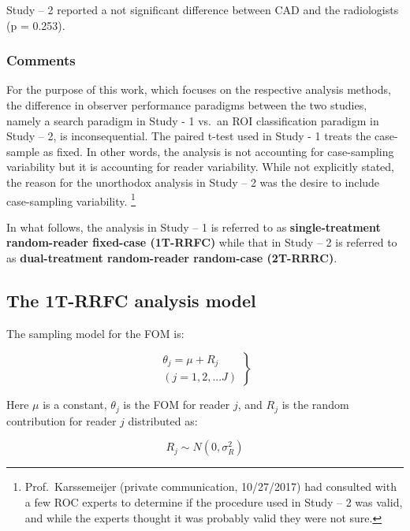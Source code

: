 \documentclass[
]{book}
\begin{document}
Study -- 2 reported a not significant difference between CAD and the radiologists (p = 0.253).

\hypertarget{standalone-cad-radiologists-comments}{%
\subsubsection{Comments}\label{standalone-cad-radiologists-comments}}

For the purpose of this work, which focuses on the respective analysis methods, the difference in observer performance paradigms between the two studies, namely a search paradigm in Study - 1 vs.~an ROI classification paradigm in Study -- 2, is inconsequential. The paired t-test used in Study - 1 treats the case-sample as fixed. In other words, the analysis is not accounting for case-sampling variability but it is accounting for reader variability. While not explicitly stated, the reason for the unorthodox analysis in Study -- 2 was the desire to include case-sampling variability. \footnote{Prof.~Karssemeijer (private communication, 10/27/2017) had consulted with a few ROC experts to determine if the procedure used in Study -- 2 was valid, and while the experts thought it was probably valid they were not sure.}

In what follows, the analysis in Study -- 1 is referred to as \textbf{single-treatment random-reader fixed-case (1T-RRFC)} while that in Study -- 2 is referred to as \textbf{dual-treatment random-reader random-case (2T-RRRC)}.

\hypertarget{the-1t-rrfc-analysis-model}{%
\subsection{The 1T-RRFC analysis model}\label{the-1t-rrfc-analysis-model}}

The sampling model for the FOM is:

\begin{equation}
\left.
\begin{aligned}
\theta_j=\mu+R_j \\
\left (j = 1,2,...J  \right )
\end{aligned}
\right \}
\label{eq:standalone-1t-rrfc}
\end{equation}

Here \(\mu\) is a constant, \(\theta_j\) is the FOM for reader \(j\), and \(R_j\) is the random contribution for reader \(j\) distributed as:

\begin{equation}
R_j \sim  N\left ( 0,\sigma_R^2 \right )
\label{eq:standalone-cad-2t-rrfc-rj-sampling}
\end{equation}
\end{document}
